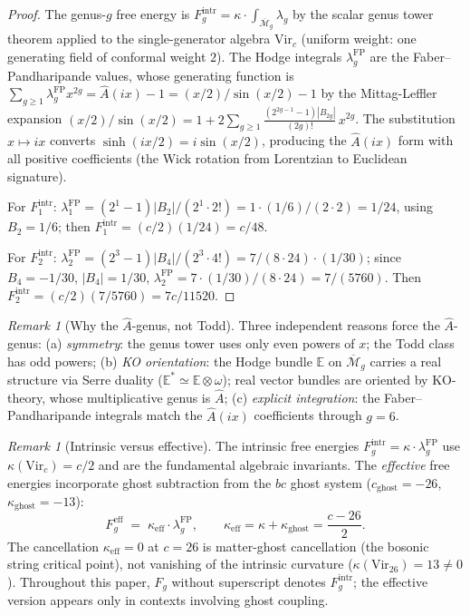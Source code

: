 \documentclass[11pt,reqno]{amsart}
\theoremstyle{definition}
\theoremstyle{remark}
\newtheorem{remark}[theorem]{Remark}
\begin{document}
\begin{proof}
The genus-$g$ free energy is
$F_g^{\mathrm{intr}} = \kappa \cdot
\int_{\overline{\mathcal{M}}_g}\lambda_g$ by the scalar genus tower
theorem applied to the single-generator algebra $\mathrm{Vir}_c$
(uniform weight: one generating field of conformal weight $2$). The
Hodge integrals $\lambda_g^{\mathrm{FP}}$ are the
Faber--Pandharipande values, whose generating function is
$\sum_{g \ge 1}\lambda_g^{\mathrm{FP}} x^{2g}
= \hat{A}(ix) - 1 = (x/2)/\sin(x/2) - 1$ by the Mittag-Leffler
expansion
$(x/2)/\sin(x/2) = 1 + 2\sum_{g \ge 1}
\frac{(2^{2g-1}-1)|B_{2g}|}{(2g)!}\,x^{2g}$.
The substitution $x \mapsto ix$ converts
$\sinh(ix/2) = i\sin(x/2)$, producing the $\hat{A}(ix)$ form with
all positive coefficients (the Wick rotation from Lorentzian to
Euclidean signature).

For $F_1^{\mathrm{intr}}$:
$\lambda_1^{\mathrm{FP}}
= (2^1-1)|B_2|/(2^1 \cdot 2!)
= 1 \cdot (1/6)/(2 \cdot 2) = 1/24$,
using $B_2 = 1/6$; then
$F_1^{\mathrm{intr}} = (c/2)(1/24) = c/48$.

For $F_2^{\mathrm{intr}}$:
$\lambda_2^{\mathrm{FP}} = (2^3-1)|B_4|/(2^3 \cdot 4!)
= 7/(8 \cdot 24) \cdot (1/30)$; since $B_4 = -1/30$,
$|B_4| = 1/30$, $\lambda_2^{\mathrm{FP}}
= 7 \cdot (1/30)/(8 \cdot 24) = 7/(5760)$.
Then $F_2^{\mathrm{intr}} = (c/2)(7/5760) = 7c/11520$.
\end{proof}

\begin{remark}[Why the $\hat{A}$-genus, not Todd]
\label{rem:why-a-hat}
Three independent reasons force the $\hat{A}$-genus:
(a) \emph{symmetry}: the genus tower uses only even powers of $x$;
the Todd class has odd powers;
(b) \emph{KO orientation}: the Hodge bundle
$\mathbb{E}$ on $\overline{\mathcal{M}}_g$ carries a real structure
via Serre duality ($\mathbb{E}^* \simeq \mathbb{E} \otimes \omega$);
real vector bundles are oriented by KO-theory, whose multiplicative
genus is $\hat{A}$;
(c) \emph{explicit integration}: the Faber--Pandharipande integrals
match the $\hat{A}(ix)$ coefficients through $g = 6$.
\end{remark}

\begin{remark}[Intrinsic versus effective]
\label{rem:intrinsic-effective}
The intrinsic free energies $F_g^{\mathrm{intr}} = \kappa \cdot
\lambda_g^{\mathrm{FP}}$ use $\kappa(\mathrm{Vir}_c) = c/2$ and
are the fundamental algebraic invariants. The \emph{effective} free
energies incorporate ghost subtraction from the $bc$ ghost system
($c_{\mathrm{ghost}} = -26$, $\kappa_{\mathrm{ghost}} = -13$):
\begin{equation}\label{eq:kappa-eff}
F_g^{\mathrm{eff}}
\;=\;
\kappa_{\mathrm{eff}} \cdot \lambda_g^{\mathrm{FP}},
\qquad
\kappa_{\mathrm{eff}} = \kappa + \kappa_{\mathrm{ghost}}
= \frac{c-26}{2}.
\end{equation}
The cancellation $\kappa_{\mathrm{eff}} = 0$ at $c = 26$ is
matter-ghost cancellation (the bosonic string critical point), not
vanishing of the intrinsic curvature
($\kappa(\mathrm{Vir}_{26}) = 13 \ne 0$). Throughout this paper,
$F_g$ without superscript denotes $F_g^{\mathrm{intr}}$; the
effective version appears only in contexts involving ghost coupling.
\end{remark}
\end{document}
